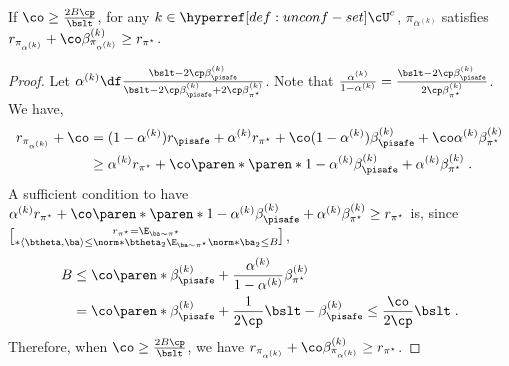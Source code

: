 \begin{lemma}\label{lemma:optimism}
If $\co \geq \frac{2B\cp}{\bslt}$, for any $k \in \unconfBandit^c$, $\pi_{\alpha^{(k)}}$ satisfies
\(r_{\pi_{\alpha^{(k)}}} + \co \beta^{(k)}_{\pi_{\alpha^{(k)}}} \geq r_{\pi^{\star}}\).
\end{lemma}
\begin{proof}
Let $\alpha^{(k)} \df \frac{\bslt - 2\cp \beta^{(k)}_{\pisafe}}{\bslt - 2\cp \beta^{(k)}_{\pisafe} + 2\cp \beta^{(k)}_{\pi^\star}}$.
Note that 
$\frac{\alpha^{(k)}}{1 - \alpha^{(k)}} = \frac{\bslt - 2\cp \beta^{(k)}_{\pisafe}}{2\cp \beta^{(k)}_{\pi^\star}}$.
We have,
\begin{align*}
r_{\pi_{\alpha^{(k)}}} + \co
&= (1-\alpha^{(k)}) r_{\pisafe} + \alpha^{(k)} r_{\pi^{\star}} + \co (1-\alpha^{(k)}) \beta^{(k)}_{\pisafe} + \co \alpha^{(k)} \beta^{(k)}_{\pi^\star}\\
&\geq \alpha^{(k)} r_{\pi^{\star}} +  \co\paren*{\paren*{1-\alpha^{(k)}}\beta^{(k)}_{\pisafe} + \alpha^{(k)} \beta^{(k)}_{\pi^\star}} \;.
\end{align*}
A sufficient condition to have
$
\alpha^{(k)} r_{\pi^{\star}} + 
\co \paren*{\paren*{1-\alpha^{(k)}}\beta^{(k)}_{\pisafe} + \alpha^{(k)} \beta^{(k)}_{\pi^\star}}
\geq r_{\pi^\star}$ is, since $r_{\pi^\star} = \E_{\ba \sim \pi^\star}\brack*{\left\langle\btheta, \ba\right\rangle} \leq \norm*{\btheta}_2 \E_{\ba \sim \pi^\star}\norm*{\ba}_2 \leq B$, 
\begin{align*}
B 
&\leq \co\paren*{\beta^{(k)}_{\pisafe} + \frac{\alpha^{(k)}}{1-\alpha^{(k)}} \beta^{(k)}_{\pi^\star}}\\
&= \co\paren*{\beta^{(k)}_{\pisafe} + \frac{1}{2\cp}\bslt - \beta^{(k)}_{\pisafe}}
\leq \frac{\co}{2\cp}\bslt\;.
\end{align*}
Therefore, when $\co \geq \frac{2B \cp}{\bslt}$, we have
\(
r_{\pi_{\alpha^{(k)}}} + \co \beta^{(k)}_{\pi_{\alpha^{(k)}}} \geq r_{\pi^{\star}}
\).
\end{proof}

